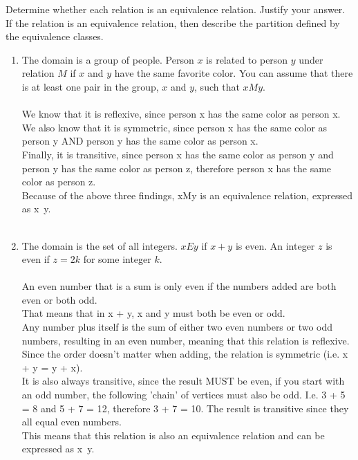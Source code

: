 \documentclass{amsart}
\theoremstyle{definition}
\theoremstyle{Exercise}
\theoremstyle{remark}
\theoremstyle{rule}
\numberwithin{equation}{section}
\begin{document}
Determine whether each relation is an equivalence relation. Justify your answer. If the relation is an equivalence relation, then describe the partition defined by the equivalence classes.\\
\begin{enumerate}[label=(\alph*)]
\item The domain is a group of people. Person $x$ is related to person $y$ under relation $M$ if $x$ and $y$ have the same favorite color. You can assume that there is at least one pair in the group, $x$ and $y$, such that $xMy$.\\\\
We know that it is reflexive, since person x has the same color as person x.\\
We also know that it is symmetric, since person x has the same color as person y AND person y has the same color as person x.\\
Finally, it is transitive, since person x has the same color as person y and person y has the same color as person z, therefore person x has the same color as person z.\\
Because of the above three findings, xMy is an equivalence relation, expressed as x~y.
\\\\

\item The domain is the set of all integers. $xEy$ if $x + y$ is even. An integer $z$ is even if $z = 2k$ for some integer $k$.\\\\
An even number that is a sum is only even if the numbers added are both even or both odd.\\
That means that in x + y, x and y must both be even or odd.\\
Any number plus itself is the sum of either two even numbers or two odd numbers, resulting in an even number, meaning that this relation is reflexive.\\
Since the order doesn't matter when adding, the relation is symmetric (i.e. x + y = y + x).\\
It is also always transitive, since the result MUST be even, if you start with an odd number, the following 'chain' of vertices must also be odd. I.e. 3 + 5 = 8 and 5 + 7 = 12, therefore 3 + 7 = 10. The result is transitive since they all equal even numbers.\\
This means that this relation is also an equivalence relation and can be expressed as x~y.
\\\\

\end{enumerate}
\end{document}
